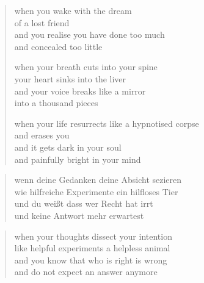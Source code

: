 {\begin{verse}
when you wake with the dream\\
of a lost friend\\
and you realise you have done too much\\
and concealed too little

when your breath cuts into your spine\\
your heart sinks into the liver\\
and your voice breaks like a mirror\\
into a thousand pieces

when your life resurrects like a hypnotised corpse\\
and erases you\\
and it gets dark in your soul\\
and painfully bright in your mind

\end{verse}

\clearpage

\begin{verse}

wenn deine Gedanken deine Absicht sezieren\\
wie hilfreiche Experimente ein hilfloses Tier\\
und du weißt dass wer Recht hat irrt\\
und keine Antwort mehr erwartest

\end{verse}

\clearpage

\begin{verse}
when your thoughts dissect your intention\\
like helpful experiments a helpless animal\\
and you know that who is right is wrong\\
and do not expect an answer anymore

\end{verse}

}
